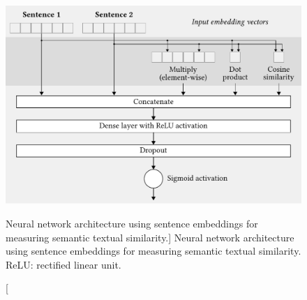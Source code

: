 \begin{figure}[!t]
\centering
\includegraphics[width=\linewidth]{img/2019-n2c2-nn/v6/img.pdf}
\caption%
[Neural network architecture using sentence embeddings for measuring semantic textual similarity.]%
{Neural network architecture using sentence embeddings for measuring semantic textual similarity. ReLU: rectified linear unit.}
\label{fig:2019-n2c2-nn}
\end{figure}
